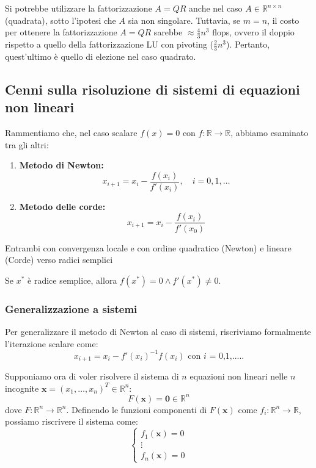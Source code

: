 \begin{osservazione}
Si potrebbe utilizzare la fattorizzazione $A=QR$ anche nel caso $A \in \mathbb{R}^{n \times n}$ (quadrata), sotto l'ipotesi che $A$ sia non singolare.
Tuttavia, se $m=n$, il costo per ottenere la fattorizzazione $A=QR$ sarebbe $\approx \frac{4}{3}n^3$ flops, ovvero il doppio rispetto a quello della fattorizzazione LU con pivoting ($\frac{2}{3}n^3$).
Pertanto, quest'ultimo è quello di elezione nel caso quadrato.
\end{osservazione}

\subsection{Cenni sulla risoluzione di sistemi di equazioni non lineari}

Rammentiamo che, nel caso scalare $f(x)=0$ con $f: \mathbb{R} \to \mathbb{R}$, abbiamo esaminato tra gli altri:
\begin{enumerate}
    \item \textbf{Metodo di Newton:}
    $$ x_{i+1} = x_i - \frac{f(x_i)}{f'(x_i)}, \quad i=0,1,\dots $$
    \item \textbf{Metodo delle corde:}
    $$ x_{i+1} = x_i - \frac{f(x_i)}{f'(x_0)} $$
\end{enumerate}
Entrambi con convergenza locale e con ordine quadratico (Newton) e lineare (Corde) verso radici semplici 

\begin{osservazione}
    Se $x^*$ è radice semplice, allora $f(x^*)=0 \wedge f'(x^*) \neq 0$.
\end{osservazione}


\subsubsection{Generalizzazione a sistemi}
Per generalizzare il metodo di Newton al caso di sistemi, riscriviamo formalmente l'iterazione scalare come:
$$ x_{i+1} = x_i - f'(x_i)^{-1} f(x_i) \text{  con $i$ = 0,1,.....}$$ 

Supponiamo ora di voler risolvere il sistema di $n$ equazioni non lineari nelle $n$ incognite $\mathbf{x} = (x_1, \dots, x_n)^T \in \mathbb{R}^n$:
\begin{equation} \label{eq:sis_nonlin}
    F(\mathbf{x}) = \mathbf{0} \in \mathbb{R}^n
\end{equation}
dove $F: \mathbb{R}^n \to \mathbb{R}^n$.
Definendo le funzioni componenti di $F(\mathbf{x})$ come $f_i: \mathbb{R}^n \to \mathbb{R}$, possiamo riscrivere il sistema come:
$$ \begin{cases} f_1(\mathbf{x}) = 0 \\ \vdots \\ f_n(\mathbf{x}) = 0 \end{cases} $$

